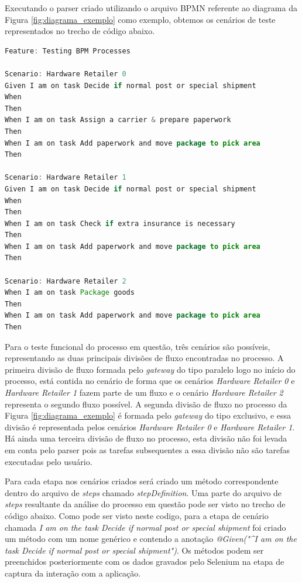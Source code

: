 \documentclass[12pt]{article}
\begin{document}
Executando o parser criado utilizando o arquivo BPMN referente ao diagrama da Figura \ref{fig:diagrama_exemplo} como exemplo, obtemos os cenários de teste representados no trecho de código abaixo. 


\begin{lstlisting}[language=Java]
Feature: Testing BPM Processes  
 
Scenario: Hardware Retailer 0 
Given I am on task Decide if normal post or special shipment 
When 
Then 
When I am on task Assign a carrier & prepare paperwork 
Then 
When I am on task Add paperwork and move package to pick area 
Then 
 
Scenario: Hardware Retailer 1 
Given I am on task Decide if normal post or special shipment 
When 
Then 
When I am on task Check if extra insurance is necessary 
Then 
When I am on task Add paperwork and move package to pick area 
Then 
 
Scenario: Hardware Retailer 2
When I am on task Package goods 
Then 
When I am on task Add paperwork and move package to pick area 
Then 

\end{lstlisting}

Para o teste funcional do processo em questão, três cenários são possíveis, representando as duas principais divisões de fluxo encontradas no processo. A primeira divisão de fluxo formada pelo \emph{gateway} do tipo paralelo logo no início do processo, está contida no cenário de forma que os cenários \emph{Hardware Retailer 0} e \emph{Hardware Retailer 1} fazem parte de um fluxo e o cenário \emph{Hardware Retailer 2} representa o segundo fluxo possível. A segunda divisão de fluxo no processo da Figura \ref{fig:diagrama_exemplo} é formada pelo \emph{gateway} do tipo exclusivo, e essa divisão é representada pelos cenários \emph{Hardware Retailer 0} e \emph{Hardware Retailer 1}. Há ainda uma terceira divisão de fluxo no processo, esta divisão não foi levada em conta pelo parser pois as tarefas subsequentes a essa divisão não são tarefas executadas pelo usuário.



Para cada etapa nos cenários criados será criado um método correspondente dentro do arquivo de \emph{steps} chamado \emph{stepDefinition}. Uma parte do arquivo de \emph{steps} resultante da análise do processo em questão pode ser visto no trecho de código abaixo. Como pode ser visto neste codigo, para a etapa de cenário chamada \emph{I am on the task Decide if normal post or special shipment} foi criado um método com um nome genérico e contendo a anotação \emph{@Given("\^{}I am on the task Decide if normal post or special shipment\textdollar{}")}. Os métodos podem ser preenchidos posteriormente com os dados gravados pelo Selenium na etapa de captura da interação com a aplicação.
\end{document}
